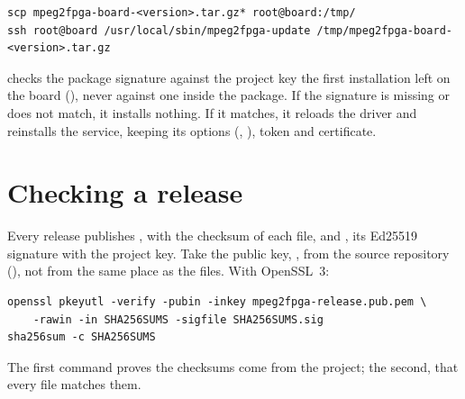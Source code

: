 \begin{lstlisting}[language=shell]
scp mpeg2fpga-board-<version>.tar.gz* root@board:/tmp/
ssh root@board /usr/local/sbin/mpeg2fpga-update /tmp/mpeg2fpga-board-<version>.tar.gz
\end{lstlisting}

 checks the package signature against the project key
the first installation left on the board
(), never against one inside the
package. If the signature is missing or does not match, it installs nothing.
If it matches, it reloads the driver and reinstalls the service, keeping its
options (, ), token and certificate.

\section{Checking a release}
\label{sec:verify}

Every release publishes , with the checksum of each file, and
, its Ed25519 signature with the project key. Take the
public key, , from the source repository
(), not from the same place as the files. With OpenSSL~3:

\begin{lstlisting}[language=shell]
openssl pkeyutl -verify -pubin -inkey mpeg2fpga-release.pub.pem \
    -rawin -in SHA256SUMS -sigfile SHA256SUMS.sig
sha256sum -c SHA256SUMS
\end{lstlisting}

The first command proves the checksums come from the project; the second,
that every file matches them.
